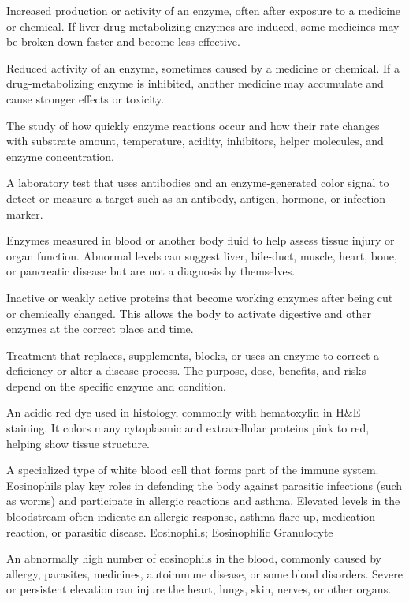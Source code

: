  Increased production or activity of an enzyme, often after exposure to a medicine or chemical. If liver drug-metabolizing enzymes are induced, some medicines may be broken down faster and become less effective.

 Reduced activity of an enzyme, sometimes caused by a medicine or chemical. If a drug-metabolizing enzyme is inhibited, another medicine may accumulate and cause stronger effects or toxicity.

 The study of how quickly enzyme reactions occur and how their rate changes with substrate amount, temperature, acidity, inhibitors, helper molecules, and enzyme concentration.

 A laboratory test that uses antibodies and an enzyme-generated color signal to detect or measure a target such as an antibody, antigen, hormone, or infection marker.

 Enzymes measured in blood or another body fluid to help assess tissue injury or organ function. Abnormal levels can suggest liver, bile-duct, muscle, heart, bone, or pancreatic disease but are not a diagnosis by themselves.

 Inactive or weakly active proteins that become working enzymes after being cut or chemically changed. This allows the body to activate digestive and other enzymes at the correct place and time.

 Treatment that replaces, supplements, blocks, or uses an enzyme to correct a deficiency or alter a disease process. The purpose, dose, benefits, and risks depend on the specific enzyme and condition.

 An acidic red dye used in histology, commonly with hematoxylin in H\&E staining. It colors many cytoplasmic and extracellular proteins pink to red, helping show tissue structure.

 A specialized type of white blood cell that forms part of the immune system. Eosinophils play key roles in defending the body against parasitic infections (such as worms) and participate in allergic reactions and asthma. Elevated levels in the bloodstream often indicate an allergic response, asthma flare-up, medication reaction, or parasitic disease.
\synonyms
Eosinophils; Eosinophilic Granulocyte

 An abnormally high number of eosinophils in the blood, commonly caused by allergy, parasites, medicines, autoimmune disease, or some blood disorders. Severe or persistent elevation can injure the heart, lungs, skin, nerves, or other organs.

